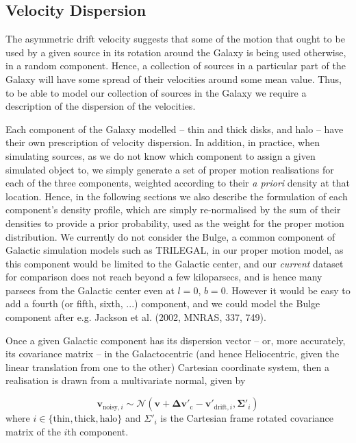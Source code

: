 \documentclass[fleqn,usenatbib]{mnras}
\begin{document}
\subsection{Velocity Dispersion}
The asymmetric drift velocity suggests that some of the motion that ought to be used by a given source in its rotation around the Galaxy is being used otherwise, in a random component.
Hence, a collection of sources in a particular part of the Galaxy will have some spread of their velocities around some mean value.
Thus, to be able to model our collection of sources in the Galaxy we require a description of the dispersion of the velocities.

Each component of the Galaxy modelled -- thin and thick disks, and halo -- have their own prescription of velocity dispersion.
In addition, in practice, when simulating sources, as we do not know which component to assign a given simulated object to, we simply generate a set of proper motion realisations for each of the three components, weighted according to their \textit{a priori} density at that location.
Hence, in the following sections we also describe the formulation of each component's density profile, which are simply re-normalised by the sum of their densities to provide a prior probability, used as the weight for the proper motion distribution.
We currently do not consider the Bulge, a common component of Galactic simulation models such as TRILEGAL, in our proper motion model, as this component would be limited to the Galactic center, and our \textit{current} dataset for comparison does not reach beyond a few kiloparsecs, and is hence many parsecs from the Galactic center even at $l = 0$, $b = 0$.
However it would be easy to add a fourth (or fifth, sixth, ...) component, and we could model the Bulge component after e.g. Jackson et al. (2002, MNRAS, 337, 749).

Once a given Galactic component has its dispersion vector -- or, more accurately, its covariance matrix -- in the Galactocentric (and hence Heliocentric, given the linear translation from one to the other) Cartesian coordinate system, then a realisation is drawn from a multivariate normal, given by

\begin{equation}
    \bm{v}_{\mathrm{noisy}, i} \sim \mathcal{N}(\bm{v} + \bm{\Delta v}{'}_\mathrm{\!\!c} - \bm{v}{'}_{\mathrm{\!\!drift}, i}, \bm{\Sigma}{'}_{\!i})
\end{equation}
where $i \in \{\mathrm{thin}, \mathrm{thick}, \mathrm{halo}\}$ and $\Sigma{'}_{\!i}$ is the Cartesian frame rotated covariance matrix of the $i$th component.
\end{document}
